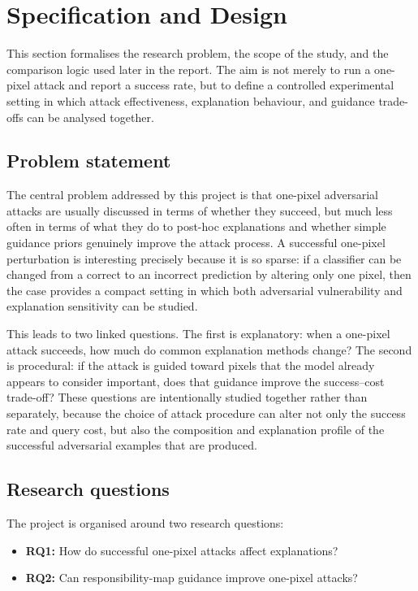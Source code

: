 \section{Specification and Design}
\label{sec:problem_formulation}

This section formalises the research problem, the scope of the study, and the comparison logic used later in the report.
The aim is not merely to run a one-pixel attack and report a success rate, but to define a controlled experimental setting in which attack effectiveness, explanation behaviour, and guidance trade-offs can be analysed together.

\subsection{Problem statement}
The central problem addressed by this project is that one-pixel adversarial attacks are usually discussed in terms of whether they succeed, but much less often in terms of what they do to post-hoc explanations and whether simple guidance priors genuinely improve the attack process.
A successful one-pixel perturbation is interesting precisely because it is so sparse: if a classifier can be changed from a correct to an incorrect prediction by altering only one pixel, then the case provides a compact setting in which both adversarial vulnerability and explanation sensitivity can be studied.

This leads to two linked questions.
The first is explanatory: when a one-pixel attack succeeds, how much do common explanation methods change?
The second is procedural: if the attack is guided toward pixels that the model already appears to consider important, does that guidance improve the success--cost trade-off?
These questions are intentionally studied together rather than separately, because the choice of attack procedure can alter not only the success rate and query cost, but also the composition and explanation profile of the successful adversarial examples that are produced.

\subsection{Research questions}
The project is organised around two research questions:

\begin{itemize}
  \item \textbf{RQ1:} How do successful one-pixel attacks affect explanations?
  \item \textbf{RQ2:} Can responsibility-map guidance improve one-pixel attacks?
\end{itemize}

